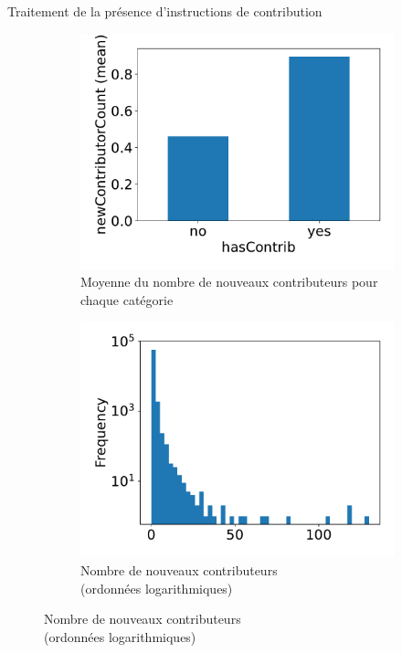 \documentclass[usenames,dvipsnames,10pt]{beamer}
\begin{document}
\begin{frame}{Traitement de la présence d'instructions de contribution}
    \begin{figure}
        \begin{subfigure}[t]{0.45\textwidth}
            \includegraphics[width=\textwidth]{../experiment/data_analysis/hasContrib_meanNewContributorCount}
            \caption{Moyenne du nombre de nouveaux contributeurs pour chaque catégorie}
        \end{subfigure}
        \begin{subfigure}[t]{0.45\textwidth}
            \includegraphics[width=\textwidth]{../experiment/data_analysis/newContributorCount_distribution}
            \caption{Nombre de nouveaux contributeurs\\(ordonnées logarithmiques)}
        \end{subfigure}
    \end{figure}
\end{frame}
\end{document}
